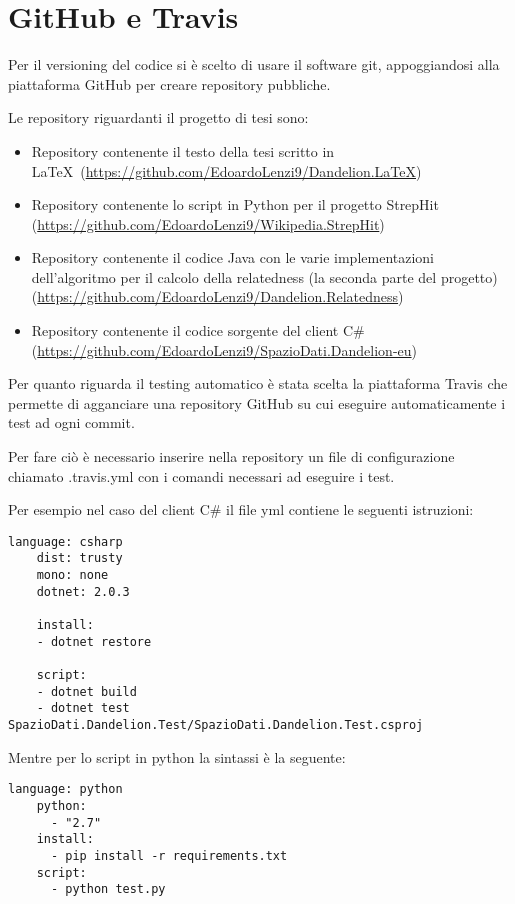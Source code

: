 \section{GitHub e Travis}
Per il versioning del codice si è scelto di usare il software git, appoggiandosi alla piattaforma GitHub per creare repository pubbliche. 

Le repository riguardanti il progetto di tesi sono:

\begin{itemize}
    \item Repository contenente il testo della tesi scritto in \LaTeX\ (\url{https://github.com/EdoardoLenzi9/Dandelion.LaTeX}) \\
    \item Repository contenente lo script in Python per il progetto StrepHit (\url{https://github.com/EdoardoLenzi9/Wikipedia.StrepHit}) \\
    \item Repository contenente il codice Java con le varie implementazioni dell'algoritmo per il calcolo della relatedness (la seconda parte del progetto) (\url{https://github.com/EdoardoLenzi9/Dandelion.Relatedness}) \\
    \item Repository contenente il codice sorgente del client C$\#$ (\url{https://github.com/EdoardoLenzi9/SpazioDati.Dandelion-eu})\\
\end{itemize} 

Per quanto riguarda il testing automatico è stata scelta la piattaforma Travis che permette di agganciare una repository GitHub su cui eseguire automaticamente i test 
ad ogni commit. 

Per fare ciò è necessario inserire nella repository un file di configurazione chiamato .travis.yml con i comandi necessari ad eseguire i test. 

Per esempio nel caso del client C$\#$ il file yml contiene le seguenti istruzioni:

\begin{lstlisting}[style=YmlStyle]
    language: csharp
    dist: trusty
    mono: none
    dotnet: 2.0.3

    install:
    - dotnet restore

    script:
    - dotnet build
    - dotnet test SpazioDati.Dandelion.Test/SpazioDati.Dandelion.Test.csproj
\end{lstlisting}

Mentre per lo script in python la sintassi è la seguente:
\begin{lstlisting}[style=YmlStyle]
    language: python
    python: 
      - "2.7"
    install:
      - pip install -r requirements.txt
    script:
      - python test.py
\end{lstlisting}

